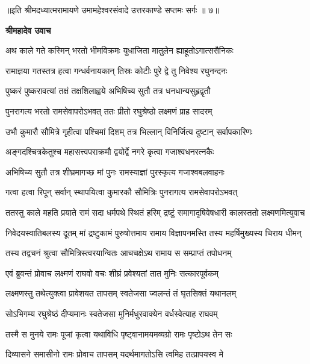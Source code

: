 {॥इति श्रीमदध्यात्मरामायणे उमामहेश्वरसंवादे उत्तरकाण्डे सप्तमः
सर्गः ॥ ७॥
}




\textbf{श्रीमहादेव उवाच}

\twolineshloka
{अथ काले गते कस्मिन् भरतो भीमविक्रमः}
{युधाजिता मातुलेन ह्याहूतोऽगात्ससैनिकः} %

\twolineshloka
{रामाज्ञया गतस्तत्र हत्वा गन्धर्वनायकान्}
{तिस्रः कोटीः पुरे द्वे तु निवेश्य रघुनन्दनः} %

\twolineshloka
{पुष्करं पुष्करावत्यां तक्षं तक्षशिलाह्वये}
{अभिषिच्य सुतौ तत्र धनधान्यसुहृद्वृतौ} %

\twolineshloka
{पुनरागत्य भरतो रामसेवापरोऽभवत्}
{ततः प्रीतो रघुश्रेष्ठो लक्ष्मणं प्राह सादरम्} %

\twolineshloka
{उभौ कुमारौ सौमित्रे गृहीत्वा पश्चिमां दिशम्}
{तत्र भिल्लान् विनिर्जित्य दुष्टान् सर्वापकारिणः} %

\twolineshloka
{अङ्गदश्चित्रकेतुश्च महासत्त्वपराक्रमौ}
{द्वयोर्द्वे नगरे कृत्वा गजाश्वधनरत्नकैः} %

\twolineshloka
{अभिषिच्य सुतौ तत्र शीघ्रमागच्छ मां पुनः}
{रामस्याज्ञां पुरस्कृत्य गजाश्वबलवाहनः} %

\twolineshloka
{गत्वा हत्वा रिपून् सर्वान् स्थापयित्वा कुमारकौ}
{सौमित्रिः पुनरागत्य रामसेवापरोऽभवत्} %

\fourlineindentedshloka
{ततस्तु काले महति प्रयाते}
{रामं सदा धर्मपथे स्थितं हरिम्}
{द्रष्टुं समागादृषिवेषधारी}
{कालस्ततो लक्ष्मणमित्युवाच} %

\fourlineindentedshloka
{निवेदयस्वातिबलस्य दूतम्}
{मां द्रष्टुकामं पुरुषोत्तमाय}
{रामाय विज्ञापनमस्ति तस्य}
{महर्षिमुख्यस्य चिराय धीमन्} %

\twolineshloka
{तस्य तद्वचनं श्रुत्वा सौमित्रिस्त्वरयान्वितः}
{आचचक्षेऽथ रामाय स सम्प्राप्तं तपोधनम्} %

\twolineshloka
{एवं ब्रुवन्तं प्रोवाच लक्ष्मणं राघवो वचः}
{शीघ्रं प्रवेश्यतां तात मुनिः सत्कारपूर्वकम्} %

\twolineshloka
{लक्ष्मणस्तु तथेत्युक्त्वा प्रावेशयत तापसम्}
{स्वतेजसा ज्वलन्तं तं घृतसिक्तं यथानलम्} %

\twolineshloka
{सोऽभिगम्य रघुश्रेष्ठं दीप्यमानः स्वतेजसा}
{मुनिर्मधुरवाक्येन वर्धस्वेत्याह राघवम्} %

\twolineshloka
{तस्मै स मुनये रामः पूजां कृत्वा यथाविधि}
{पृष्ट्वानामयमव्यग्रो रामः पृष्टोऽथ तेन सः} %

\twolineshloka
{दिव्यासने समासीनो रामः प्रोवाच तापसम्}
{यदर्थमागतोऽसि त्वमिह तत्प्रापयस्व मे} %

